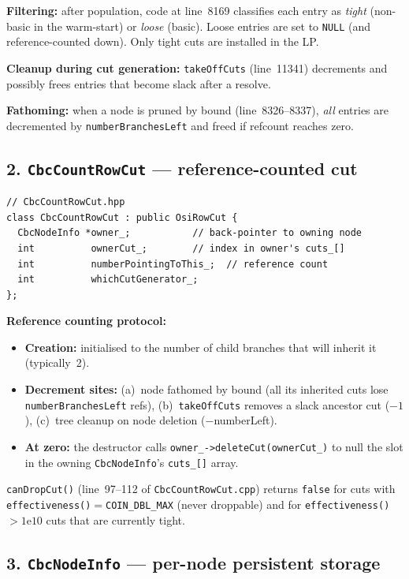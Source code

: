\documentclass[11pt,a4paper]{article}
\begin{document}
\textbf{Filtering:} after population, code at line~8169 classifies
each entry as \emph{tight} (non-basic in the warm-start) or
\emph{loose} (basic).  Loose entries are set to \texttt{NULL} (and
reference-counted down).  Only tight cuts are installed in the LP.

\textbf{Cleanup during cut generation:} \texttt{takeOffCuts}
(line~11341) decrements and possibly frees entries that become
slack after a resolve.

\textbf{Fathoming:} when a node is pruned by bound
(line~8326--8337), \emph{all} entries are decremented by
\texttt{numberBranchesLeft} and freed if refcount reaches zero.

\subsection*{2. \texttt{CbcCountRowCut} --- reference-counted cut}

\begin{lstlisting}
// CbcCountRowCut.hpp
class CbcCountRowCut : public OsiRowCut {
  CbcNodeInfo *owner_;           // back-pointer to owning node
  int          ownerCut_;        // index in owner's cuts_[]
  int          numberPointingToThis_;  // reference count
  int          whichCutGenerator_;
};
\end{lstlisting}

\textbf{Reference counting protocol:}
\begin{itemize}[leftmargin=*]
  \item \textbf{Creation:} initialised to the number of child
        branches that will inherit it (typically~2).
  \item \textbf{Decrement sites:}
    (a)~node fathomed by bound (all its inherited cuts lose
        \texttt{numberBranchesLeft} refs),
    (b)~\texttt{takeOffCuts} removes a slack ancestor cut ($-1$),
    (c)~tree cleanup on node deletion ($-$numberLeft).
  \item \textbf{At zero:} the destructor calls
        \texttt{owner\_->deleteCut(ownerCut\_)} to null the slot in
        the owning \texttt{CbcNodeInfo}'s \texttt{cuts\_[]} array.
\end{itemize}

\texttt{canDropCut()} (line~97--112 of \texttt{CbcCountRowCut.cpp})
returns \texttt{false} for cuts with
\texttt{effectiveness()$=$COIN\_DBL\_MAX} (never droppable) and for
\texttt{effectiveness()$>1\mathrm{e}10$} cuts that are currently
tight.

\subsection*{3. \texttt{CbcNodeInfo} --- per-node persistent storage}
\end{document}
